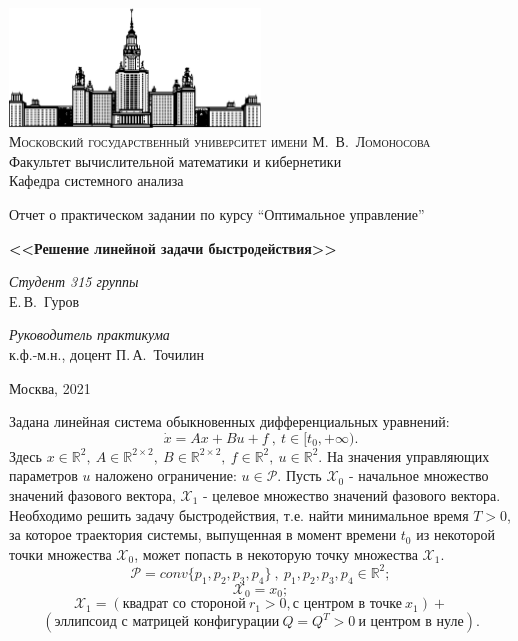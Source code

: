 \documentclass[10pt]{article}
\begin{document}
\thispagestyle{empty}

\begin{center}
\ \vspace{-3cm}

\includegraphics[width=0.5\textwidth]{msu.png}\\
{\scshape Московский государственный университет имени М.~В.~Ломоносова}\\
Факультет вычислительной математики и кибернетики\\
Кафедра системного анализа

\vfill

{\LARGE Отчет о практическом задании по курсу ``Оптимальное управление'' }

\vspace{1cm}

{\Huge\bfseries <<Решение линейной задачи быстродействия>>}
\end{center}

\vspace{1cm}

\begin{flushright}
  \large
  \textit{Студент 315 группы}\\
  Е.\,В.~Гуров

  \vspace{5mm}

  \textit{Руководитель практикума}\\
  к.ф.-м.н., доцент П.\,А.~Точилин
\end{flushright}

\vfill

\begin{center}
Москва, 2021
\end{center}
\newpage

\tableofcontents
\newpage

Задана линейная система обыкновенных дифференциальных уравнений:\\
\[ \dot{x} = Ax + Bu + f  \  , \ t \in [t_0, +\infty).\]
Здесь \(x \in \mathbb{R}^2, \ A \in \mathbb{R}^{2 \times 2}, \ B \in \mathbb{R}^{2 \times 2}, \ f \in \mathbb{R}^2, \ u \in \mathbb{R}^2 .\) На значения управляющих параметров \(u\) наложено ограничение: \(u \in \mathcal{P}.\) Пусть \( \mathcal{X}_0\) - начальное множество значений фазового вектора, \(\mathcal{X}_1\) - целевое множество значений фазового вектора. Необходимо решить задачу быстродействия, т.е. найти минимальное время \(T > 0\), за которое траектория системы, выпущенная в момент времени \(t_0\) из некоторой точки множества \(\mathcal{X}_0\), может попасть в некоторую точку множества \(\mathcal{X}_1\).
\bigskip
\[ \mathcal{P} = conv\{p_1, p_2, p_3, p_4\} \ , \ p_1, p_2, p_3, p_4 \in \mathbb{R}^2;\]
\[\mathcal{X}_0 = {x_0};\]
\[\mathcal{X}_1 = (\text{квадрат со стороной} \ r_1 > 0, \text{с центром в точке} \ x_1) + \] 
\[(\text{эллипсоид с матрицей конфигурации} \ Q = Q^T > 0  \ \text{и центром в нуле}).  \]
\end{document}
